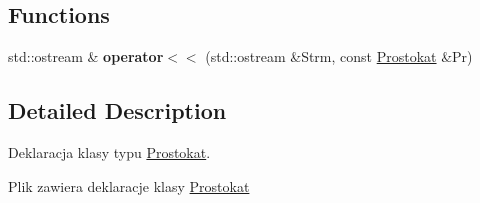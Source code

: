 \subsection*{Functions}
\begin{DoxyCompactItemize}
\item 
\hypertarget{_prostokat_8hh_ad4c8ea1b354cd71a9057c3bc7ed71f95}{std\+::ostream \& {\bfseries operator$<$$<$} (std\+::ostream \&Strm, const \hyperlink{class_prostokat}{Prostokat} \&Pr)}\label{_prostokat_8hh_ad4c8ea1b354cd71a9057c3bc7ed71f95}

\end{DoxyCompactItemize}


\subsection{Detailed Description}
Deklaracja klasy typu \hyperlink{class_prostokat}{Prostokat}. 

Plik zawiera deklaracje klasy \hyperlink{class_prostokat}{Prostokat} 